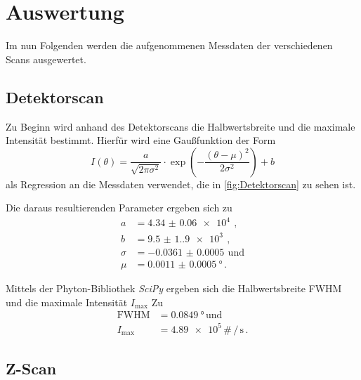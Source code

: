 \section{Auswertung}
\label{sec:Auswertung}

Im nun Folgenden werden die aufgenommenen Messdaten der verschiedenen Scans ausgewertet. 


\subsection{Detektorscan}
\label{sec:Detektorscan}

Zu Beginn wird anhand des Detektorscans die Halbwertsbreite und die maximale Intensität bestimmt.
Hierfür wird eine Gaußfunktion der Form
\begin{equation}
    I(\theta)=\frac{a}{\sqrt{2 \pi \sigma^2}} \cdot \exp \left(-\frac{(\theta-\mu)^2}{2 \sigma^2}\right)+b
\end{equation}
als Regression an die Messdaten verwendet,
die in \autoref{fig:Detektorscan} zu sehen ist.


Die daraus resultierenden Parameter ergeben sich zu 
\begin{align*}
    a & = \qty{4.34(6)e4}{} \, , \\
    b & = \qty{9.5(1.9)e3}{} \, , \\
    \sigma & = \qty{-0.0361(5)}{} \, \text{und} \\
    \mu & = \qty{0.0011(5)}{\degree} \, .
\end{align*}

Mittels der Phyton-Bibliothek \textit{SciPy} \cite{scipy} ergeben sich die Halbwertsbreite FWHM
und die maximale Intensität $I_\text{max}$ Zu
\begin{align*}
    \text{FWHM} & = \qty{0.0849}{\degree} \, \text{und} \\
    I_\text{max} & = \num{4.89e5} \, \# \, / \, \unit{\second} \, .
\end{align*}


\subsection{Z-Scan}

